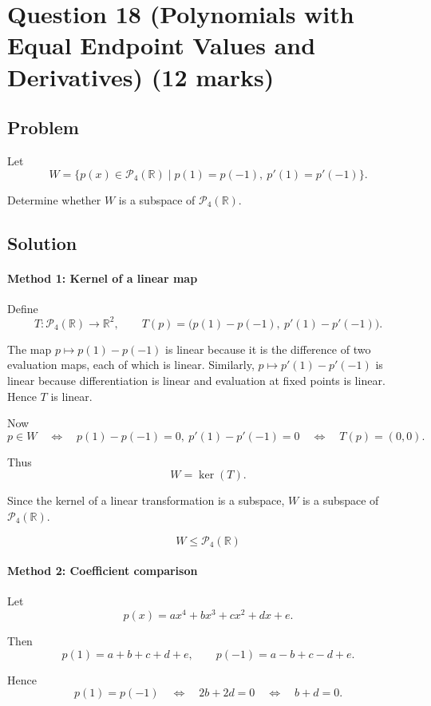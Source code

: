 \documentclass[12pt]{article}
\begin{document}
\newpage
\section{Question 18 (Polynomials with Equal Endpoint Values and Derivatives) \hfill (12 marks)}
\subsection{Problem}

Let
\[
W=\{p(x)\in\mathcal P_4(\mathbb R)\mid p(1)=p(-1),\ p'(1)=p'(-1)\}.
\]

Determine whether \(W\) is a subspace of \(\mathcal P_4(\mathbb R)\).

\subsection{Solution}

\paragraph{Method 1: Kernel of a linear map}

Define
\[
T:\mathcal P_4(\mathbb R)\to\mathbb R^2,\qquad
T(p)=\bigl(p(1)-p(-1),\ p'(1)-p'(-1)\bigr).
\]

The map \(p\mapsto p(1)-p(-1)\) is linear because it is the difference of two evaluation maps, each of which is linear. Similarly, \(p\mapsto p'(1)-p'(-1)\) is linear because differentiation is linear and evaluation at fixed points is linear. Hence \(T\) is linear.

Now
\[
p\in W
\quad\Longleftrightarrow\quad
p(1)-p(-1)=0,\ p'(1)-p'(-1)=0
\quad\Longleftrightarrow\quad
T(p)=(0,0).
\]

Thus
\[
W=\ker(T).
\]

Since the kernel of a linear transformation is a subspace, \(W\) is a subspace of \(\mathcal P_4(\mathbb R)\).

\[
\boxed{W\le \mathcal P_4(\mathbb R)}
\]

\paragraph{Method 2: Coefficient comparison}

Let
\[
p(x)=ax^4+bx^3+cx^2+dx+e.
\]

Then
\[
p(1)=a+b+c+d+e,
\qquad
p(-1)=a-b+c-d+e.
\]

Hence
\[
p(1)=p(-1)
\quad\Longleftrightarrow\quad
2b+2d=0
\quad\Longleftrightarrow\quad
b+d=0.
\]
\end{document}
